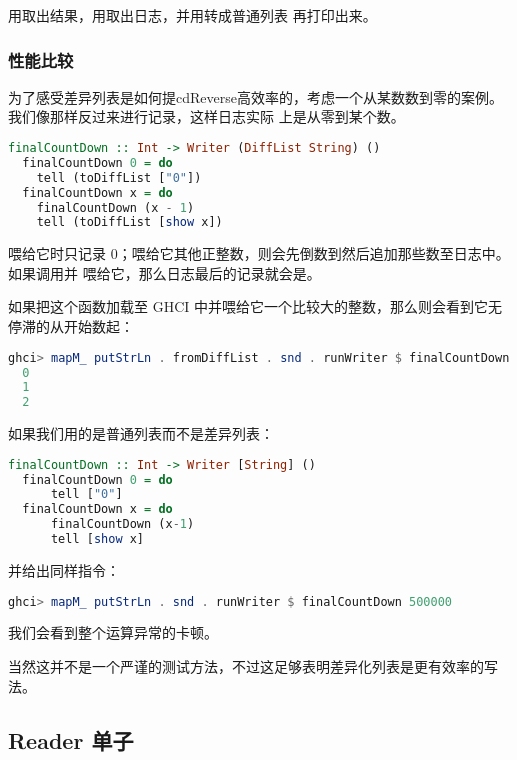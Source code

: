 \documentclass[./main.tex]{subfiles}
\begin{document}
用取出结果，用取出日志，并用转成普通列表
再打印出来。

\subsubsection*{性能比较}

为了感受差异列表是如何提cdReverse高效率的，考虑一个从某数数到零的案例。我们像那样反过来进行记录，这样日志实际
上是从零到某个数。

\begin{lstlisting}[language=Haskell]
  finalCountDown :: Int -> Writer (DiffList String) ()
  finalCountDown 0 = do
    tell (toDiffList ["0"])
  finalCountDown x = do
    finalCountDown (x - 1)
    tell (toDiffList [show x])
\end{lstlisting}

喂给它时只记录 0；喂给它其他正整数，则会先倒数到然后追加那些数至日志中。如果调用并
喂给它，那么日志最后的记录就会是。

如果把这个函数加载至 GHCI 中并喂给它一个比较大的整数，那么则会看到它无停滞的从开始数起：

\begin{lstlisting}[language=Haskell]
  ghci> mapM_ putStrLn . fromDiffList . snd . runWriter $ finalCountDown 500000
  0
  1
  2
\end{lstlisting}

如果我们用的是普通列表而不是差异列表：

\begin{lstlisting}[language=Haskell]
  finalCountDown :: Int -> Writer [String] ()
  finalCountDown 0 = do
      tell ["0"]
  finalCountDown x = do
      finalCountDown (x-1)
      tell [show x]
\end{lstlisting}

并给出同样指令：

\begin{lstlisting}[language=Haskell]
  ghci> mapM_ putStrLn . snd . runWriter $ finalCountDown 500000
\end{lstlisting}

我们会看到整个运算异常的卡顿。

当然这并不是一个严谨的测试方法，不过这足够表明差异化列表是更有效率的写法。

\subsection*{Reader 单子}
\end{document}
